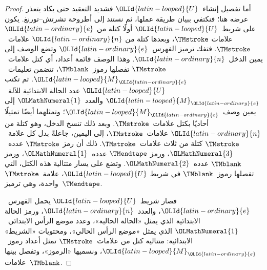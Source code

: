 \documentclass[../../../include/open-logic-section]{subfiles}
\begin{document}
\begin{proof}
  أما تفصيل إنشاء~$\OLId{latin-looped}{U}$ فشديد التعقيد حتى يكاد يتعذر عرضه هنا؛
  فنكتفي ببيان طريقة عملها، ثم نستند إلى أطروحة تشرتش--تورنغ.
  يكون على شريط~$\OLId{latin-looped}{U}$ أولًا كتلة من $\OLId{latin-ordinary}{e}$ علامات $\TMstroke$،
  وبعدها كتلة من $\OLId{latin-ordinary}{n}$ علامات~$\TMstroke$. فتفك ترميز الفهرس~$\OLId{latin-ordinary}{e}$
  وتضع الوصف إلى يمين الدخل~$\OLId{latin-ordinary}{n}$. وهذا الوصف قائمة أعداد، أي كتل
  علامات~$\TMstroke$ تفصلها رموز~$\TMblank$، تتضمن تعليمات~$\OLId{latin-looped}{M}_\OLId{latin-ordinary}{e}$.
  ثم تكتب $\OLId{latin-looped}{U}$ عدد الحالة الابتدائية للآلة~$\OLId{latin-looped}{M}_\OLId{latin-ordinary}{e}$ والعدد~$\OLMathNumeral{1}$
  إلى يمين وصف~$\OLId{latin-looped}{M}_\OLId{latin-ordinary}{e}$؛ وتمثلهما أيضًا تمثيلًا أحاديًا بكتل
  علامات~$\TMstroke$. وبعد ذلك تنسخ الدخل، وهو كتلة من $\OLId{latin-ordinary}{n}$
  علامات~$\TMstroke$، إلى اليمين، جاعلةً بدل كل علامة~$\TMstroke$
  كتلة من ثلاث علامات~$\TMstroke$. ذلك أن رمز $\TMstroke$
  عدده~$\OLMathNumeral{3}$، ورمز $\TMendtape$ عدده~$\OLMathNumeral{1}$، ورمز $\TMblank$
  عدده~$\OLMathNumeral{2}$. وتضع على يسار متتالية هذه الكتل، التي تفصلها
  رموز~$\TMblank$ في شريط $\OLId{latin-looped}{U}$، علامة~$\TMstroke$ واحدة،
  وهي ترميز~$\TMendtape$.

  فصار شريط~$\OLId{latin-looped}{U}$ يحمل الفهرس~$\OLId{latin-ordinary}{e}$، والعدد~$\OLId{latin-ordinary}{n}$، ورمز الحالة
  الابتدائية الذي يمثل «الحالة الحالية»، وعدد موضع الرأس الابتدائي~$\OLMathNumeral{1}$
  الذي يمثل «موضع الرأس الحالي»، ومحتويات «الشريط» الابتدائية:
  متتالية كتل من علامات~$\TMstroke$ تمثل أعداد رموز~$\OLId{latin-looped}{M}_\OLId{latin-ordinary}{e}$،
  ونسميها «الرموز»، وتفصل بينها علامات~$\TMblank$.


\end{proof}
\end{document}
